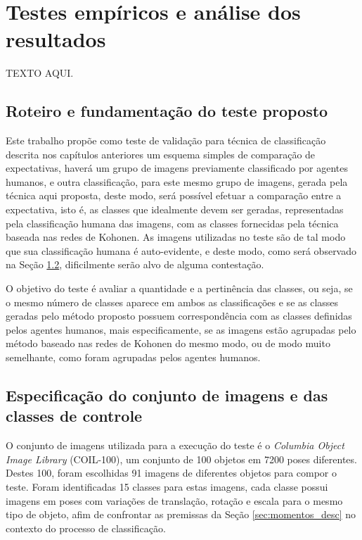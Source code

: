 \chapter{Testes empíricos e análise dos resultados}

TEXTO AQUI.

\section{Roteiro e fundamentação do teste proposto}

Este trabalho propõe como teste de validação para técnica de classificação
descrita nos capítulos anteriores um esquema simples de comparação de
expectativas, haverá um grupo de imagens previamente classificado por agentes
humanos, e outra classificação, para este mesmo grupo de imagens, gerada pela
técnica aqui proposta, deste modo, será possível efetuar a comparação entre a
expectativa, isto é, as classes que idealmente devem ser geradas, representadas
pela classificação humana das imagens, com as classes fornecidas pela técnica
baseada nas redes de Kohonen. As imagens utilizadas no teste são de tal modo
que sua classificação humana é auto-evidente, e deste modo, como será observado
na Seção \ref{sec:conjunto_de_imagens}, dificilmente serão alvo de alguma
contestação.

O objetivo do teste é avaliar a quantidade e a pertinência das classes, ou seja,
se o mesmo número de classes aparece em ambos as classificações e se as classes
geradas pelo método proposto possuem correspondência com as classes definidas
pelos agentes humanos, mais especificamente, se as imagens estão agrupadas pelo
método baseado nas redes de Kohonen do mesmo modo, ou de modo muito semelhante,
como foram agrupadas pelos agentes humanos.

\section{Especificação do conjunto de imagens e das classes de controle}
\label{sec:conjunto_de_imagens}

O conjunto de imagens utilizada para a execução do teste é o
\textit{Columbia Object Image Library} (COIL-100), um conjunto de 100
objetos em 7200 poses
diferentes. Destes 100, foram escolhidas 91 imagens de diferentes objetos para
compor o teste. Foram identificadas 15 classes para estas imagens, cada classe possui
imagens em poses com variações de translação, rotação e escala para o mesmo tipo
de objeto, afim de confrontar as premissas da Seção \ref{sec:momentos_desc} no
contexto do processo de classificação.

